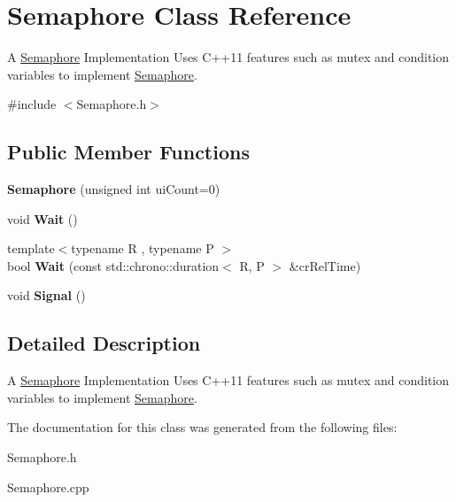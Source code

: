 \hypertarget{classSemaphore}{}\section{Semaphore Class Reference}
\label{classSemaphore}


A \hyperlink{classSemaphore}{Semaphore} Implementation Uses C++11 features such as mutex and condition variables to implement \hyperlink{classSemaphore}{Semaphore}.  




{\ttfamily \#include $<$Semaphore.\+h$>$}

\subsection*{Public Member Functions}
\begin{DoxyCompactItemize}
\item 
\mbox{\label{classSemaphore_a0d9290d316636875ca85d1d78950a817}} 
{\bfseries Semaphore} (unsigned int ui\+Count=0)
\item 
\mbox{\label{classSemaphore_a72aabebf026e3a8b1f3e4d0fa8ee1eda}} 
void {\bfseries Wait} ()
\item 
\mbox{\label{classSemaphore_a7f700173ae86ae623684109066e07656}} 
{\footnotesize template$<$typename R , typename P $>$ }\\bool {\bfseries Wait} (const std\+::chrono\+::duration$<$ R, P $>$ \&cr\+Rel\+Time)
\item 
\mbox{\label{classSemaphore_a86f92f738b4486439b296d8e235895f2}} 
void {\bfseries Signal} ()
\end{DoxyCompactItemize}


\subsection{Detailed Description}
A \hyperlink{classSemaphore}{Semaphore} Implementation Uses C++11 features such as mutex and condition variables to implement \hyperlink{classSemaphore}{Semaphore}. 

The documentation for this class was generated from the following files\+:\begin{DoxyCompactItemize}
\item 
Semaphore.\+h\item 
Semaphore.\+cpp\end{DoxyCompactItemize}
